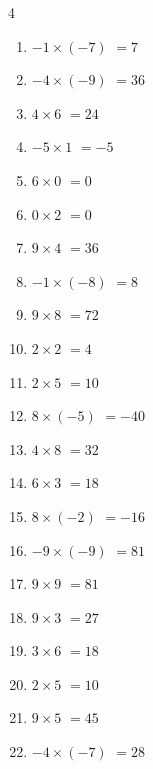 \begin{multicols}{4}
\begin{enumerate}
  \item $-1\times (-7)$
        $=7$

  \item $-4\times (-9)$
        $=36$

  \item $4\times 6$
        $=24$

  \item $-5\times 1$
        $=-5$

  \item $6\times 0$
        $=0$

  \item $0\times 2$
        $=0$

  \item $9\times 4$
        $=36$

  \item $-1\times (-8)$
        $=8$

  \item $9\times 8$
        $=72$

  \item $2\times 2$
        $=4$

  \item $2\times 5$
        $=10$

  \item $8\times (-5)$
        $=-40$

\columnbreak %

  \item $4\times 8$
        $=32$

  \item $6\times 3$
        $=18$

  \item $8\times (-2)$
        $=-16$

  \item $-9\times (-9)$
        $=81$

  \item $9\times 9$
        $=81$

  \item $9\times 3$
        $=27$

  \item $3\times 6$
        $=18$

  \item $2\times 5$
        $=10$

  \item $9\times 5$
        $=45$

  \item $-4\times (-7)$
        $=28$


\end{enumerate}
\end{multicols}
